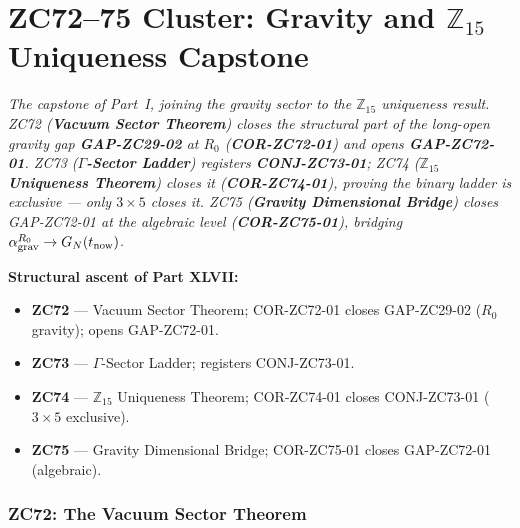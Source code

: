 \documentclass[12pt, a4paper]{article}
\begin{document}



\part{ZC72--75 Cluster: Gravity and $\mathbb{Z}_{15}$ Uniqueness Capstone}
\label{part:zc72-75}

\noindent
\textit{The capstone of Part~I, joining the gravity sector to the
$\mathbb{Z}_{15}$ uniqueness result. ZC72 (\textbf{Vacuum Sector
Theorem}) closes the structural part of the long-open gravity gap
\textbf{GAP-ZC29-02} at $R_0$ (\textbf{COR-ZC72-01}) and opens
\textbf{GAP-ZC72-01}. ZC73 (\textbf{$\Gamma$-Sector Ladder})
registers \textbf{CONJ-ZC73-01}; ZC74 (\textbf{$\mathbb{Z}_{15}$
Uniqueness Theorem}) closes it (\textbf{COR-ZC74-01}), proving the
binary ladder is exclusive --- only $3\times 5$ closes it. ZC75
(\textbf{Gravity Dimensional Bridge}) closes GAP-ZC72-01 at the
algebraic level (\textbf{COR-ZC75-01}), bridging
$\alpha_{\rm grav}^{R_0}\to G_N(t_{\rm now})$.}

\medskip
\textbf{Structural ascent of Part XLVII:}
\begin{itemize}[leftmargin=1.5em]
\item \textbf{ZC72} --- Vacuum Sector Theorem; COR-ZC72-01 closes GAP-ZC29-02 ($R_0$ gravity); opens GAP-ZC72-01.
\item \textbf{ZC73} --- $\Gamma$-Sector Ladder; registers CONJ-ZC73-01.
\item \textbf{ZC74} --- $\mathbb{Z}_{15}$ Uniqueness Theorem; COR-ZC74-01 closes CONJ-ZC73-01 ($3\times5$ exclusive).
\item \textbf{ZC75} --- Gravity Dimensional Bridge; COR-ZC75-01 closes GAP-ZC72-01 (algebraic).
\end{itemize}

\bigskip

\section{ZC72: The Vacuum Sector Theorem}
\end{document}
